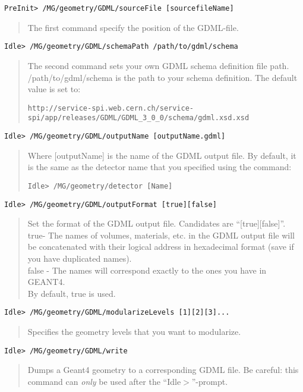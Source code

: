 \begin{lstlisting}
PreInit> /MG/geometry/GDML/sourceFile [sourcefileName] 
\end{lstlisting}
\begin{quote}
  The first command specify the position of the GDML-file.
\end{quote}
\begin{lstlisting}
Idle> /MG/geometry/GDML/schemaPath /path/to/gdml/schema
\end{lstlisting}
\begin{quote}
The second command sets your own GDML schema definition file path. /path/to/gdml/schema is the path to your schema definition. The default value is set to:
\begin{lstlisting}
http://service-spi.web.cern.ch/service-spi/app/releases/GDML/GDML_3_0_0/schema/gdml.xsd.xsd
\end{lstlisting}
\end{quote}
\begin{lstlisting}
Idle> /MG/geometry/GDML/outputName [outputName.gdml]
\end{lstlisting}
\begin{quote}
Where [outputName] is the name of the GDML output file. By default, it is the same as the detector name that you specified using the command:
\begin{lstlisting}
Idle> /MG/geometry/detector [Name]
\end{lstlisting}
\end{quote}
\begin{lstlisting}
Idle> /MG/geometry/GDML/outputFormat [true][false]
\end{lstlisting}
\begin{quote}
Set the format of the GDML output file. Candidates are ``[true][false]''.\\
true- The names of volumes, materials, etc. in the GDML output file will be concatenated with their logical address in hexadecimal format (save if you have duplicated names).\\
false - The names will correspond exactly to the ones you have in GEANT4.\\
By default, true is used.\\
\end{quote}
\begin{lstlisting}
Idle> /MG/geometry/GDML/modularizeLevels [1][2][3]...
\end{lstlisting}
\begin{quote}
Specifies the geometry levels that you want to modularize.\\
\end{quote}
\begin{lstlisting}
Idle> /MG/geometry/GDML/write
\end{lstlisting}
\begin{quote}
Dumps a Geant4 geometry to a corresponding GDML file. Be careful: this command can \textit{only} be used after the ``Idle$>$''-prompt.\\
\end{quote}
%
